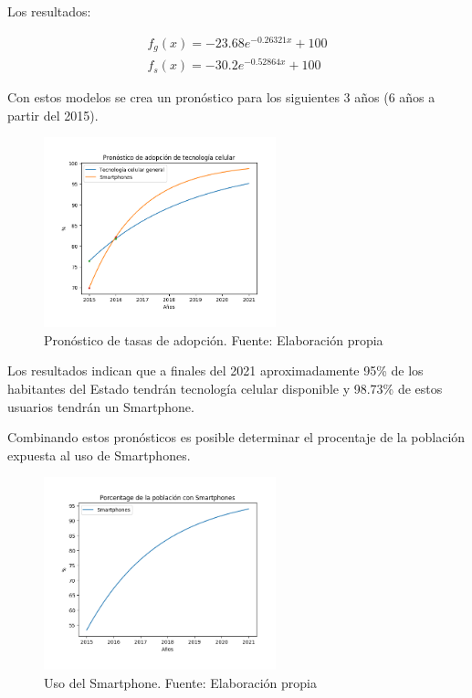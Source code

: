 \documentclass{article}
\begin{document}
Los resultados:

\begin{align*}
f_g(x) = -23.68e^{-0.26321x}+100 \\
f_s(x) = -30.2e^{-0.52864x}+100
\end{align*}

Con estos modelos se crea un pronóstico para los siguientes 3 años (6 años a partir del 2015).

	\begin{figure}[H]\centering
	\includegraphics[width=0.6\textwidth]{resources/img/pronostico_adopcion.png}
	\caption{\label{fig:pron_adp} Pronóstico de tasas de adopción. Fuente: Elaboración propia}
    \end{figure}

Los resultados indican que a finales del 2021 aproximadamente 95\% de los habitantes del Estado
tendrán tecnología celular disponible y 98.73\% de estos usuarios tendrán un Smartphone.

Combinando estos pronósticos es posible determinar el procentaje de la población expuesta al
uso de Smartphones.

	\begin{figure}[H]\centering
	\includegraphics[width=0.6\textwidth]{resources/img/smartphone_usage.png}
	\caption{\label{fig:smart_usage} Uso del Smartphone. Fuente: Elaboración propia}
    \end{figure}
\end{document}
